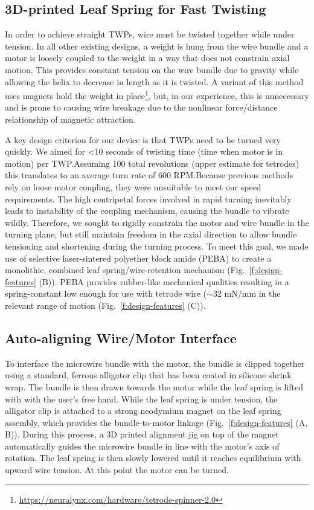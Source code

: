 \documentclass[11pt,a4paper]{article}
\begin{document}
\subsection{3D-printed Leaf Spring for Fast Twisting}
In order to achieve straight TWPs, wire must be twisted together while under
tension. In all other existing designs, a weight is hung from the wire bundle
and a motor is loosely coupled to the weight in a way that does not constrain
axial motion. This provides constant tension on the wire bundle due to gravity
while allowing the helix to decrease in length as it is twisted. A variant of
this method uses magnets hold the weight in
place\footnote{\url{https://neuralynx.com/hardware/tetrode-spinner-2.0}}, but,
in our experience, this is unnecessary and is prone to causing wire breakage
due to the nonlinear force/distance relationship of magnetic attraction.

A key design criterion for our device is that TWPs need to be turned very
quickly. We aimed for <10 seconds of twisting time (time when motor is in
motion) per TWP.\@ Assuming 100 total revolutions (upper estimate for tetrodes)
this translates to an average turn rate of 600 RPM.\@ Because previous methods
rely on loose motor coupling, they were unsuitable to meet our speed
requirements. The high centripetal forces involved in rapid turning inevitably
leads to instability of the coupling mechanism, causing the bundle to vibrate
wildly. Therefore, we sought to rigidly constrain the motor and wire
bundle in the turning plane, but still maintain freedom in the axial direction
to allow bundle tensioning and shortening during the turning process. To meet
this goal, we made use of selective laser-sintered polyether block amide (PEBA)
to create a monolithic, combined leaf spring/wire-retention mechanism
(Fig.~\ref{f:design-features} (B)). PEBA provides rubber-like mechanical
qualities resulting in a spring-constant low enough for use with tetrode wire
($\sim$32 mN/mm in the relevant range of motion (Fig.~\ref{f:design-features}
(C)).

\subsection{Auto-aligning Wire/Motor Interface}
To interface the microwire bundle with the motor, the bundle is clipped
together using a standard, ferrous alligator clip that has been coated in
silicone shrink wrap. The bundle is then drawn towards the motor while the leaf
spring is lifted with with the user's free hand. While the leaf spring is under
tension, the alligator clip is attached to a strong neodymium magnet on the
leaf spring assembly, which provides the bundle-to-motor linkage
(Fig.~\ref{f:design-features} (A, B)). During this process, a 3D printed
alignment jig on top of the magnet  automatically guides the microwire bundle
in line with the motor's axis of rotation. The leaf spring is then slowly lowered
until it reaches equilibrium with upward wire tension. At this point the motor
can be turned.
\end{document}
